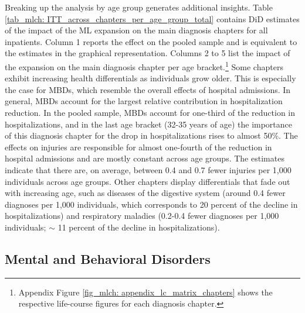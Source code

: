 Breaking up the analysis by age group generates additional insights. Table \ref{tab_mlch: ITT_across_chapters_per_age_group_total} contains DiD estimates of the impact of the ML expansion on the main diagnosis chapters for all inpatients. Column 1 reports the effect on the pooled sample and is equivalent to the estimates in the graphical representation. Columns 2 to 5 list the impact of the expansion on the main diagnosis chapter per age bracket.\footnote{Appendix Figure \ref{fig_mlch: appendix_lc_matrix_chapters} shows the respective life-course figures for each diagnosis chapter.} Some chapters exhibit increasing health differentials as individuals grow older. This is especially the case for MBDs, which resemble the overall effects of hospital admissions. In general, MBDs account for the largest relative contribution in hospitalization reduction. In the pooled sample, MBDs account for one-third of the reduction in hospitalizations, and in the last age bracket (32-35 years of age) the importance of this diagnosis chapter for the drop in hospitalizations rises to almost 50\%. The effects on injuries are responsible for almost one-fourth of the reduction in hospital admissions and are mostly constant across age groups. The estimates indicate that there are, on average, between 0.4 and 0.7 fewer injuries per 1,000 individuals across age groups. Other chapters display differentials that fade out with increasing age, such as diseases of the digestive system (around 0.4 fewer diagnoses per 1,000 individuals, which corresponds to 20 percent of the decline in hospitalizations) and respiratory maladies (0.2-0.4 fewer diagnoses per 1,000 individuals; $\sim$ 11 percent of the decline in hospitalizations).




\bigskip
\subsection{Mental and Behavioral Disorders}



